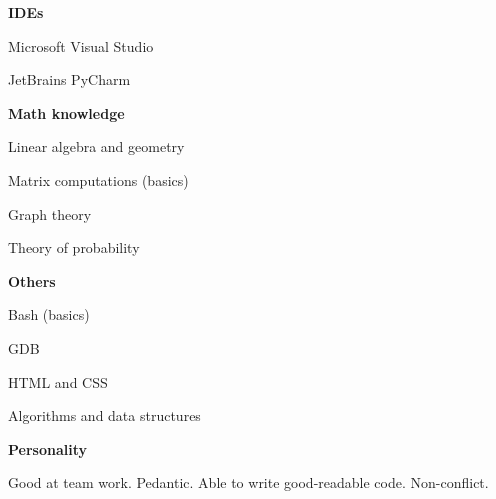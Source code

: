 \documentclass[a4paper,12pt,final]{memoir}
\newcommand{\Sep}{\vspace{1.5em}}
\newcommand{\SmallSep}{\vspace{0.5em}}
\newcommand{\CVSection}[1]
	{\Large\textbf{#1}\par
	\SmallSep\normalsize\normalfont}
\newcommand{\CVItem}[1]
	{\textbf{\color{RoyalBlue} #1}}
\begin{document}
\CVItem{IDEs}
\begin{multicols}{2}
\begin{compactitem}[\color{RoyalBlue}$\circ$]
	\item Microsoft Visual Studio 
	\item JetBrains PyCharm 
\end{compactitem}
\end{multicols}
\SmallSep

\CVItem{Math knowledge}
\begin{multicols}{2}
\begin{compactitem}[\color{RoyalBlue}$\circ$]
	\item Linear algebra and geometry
	\item Matrix computations (basics)
	\item Graph theory
	\item Theory of probability
\end{compactitem}
\end{multicols}
\SmallSep

\CVItem{Others}
\begin{multicols}{2}
\begin{compactitem}[\color{RoyalBlue}$\circ$]
	\item Bash (basics)
	\item GDB 
	\item HTML and CSS
	\item Algorithms and data structures

\end{compactitem}
\end{multicols}
\Sep 

\CVSection{Personality}
Good at team work. Pedantic. Able to write good-readable code. Non-conflict.
\Sep

\clearpage
\framebreak

\end{document}
